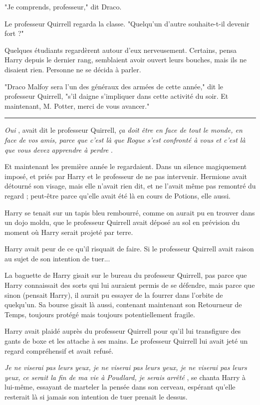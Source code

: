 "Je comprends, professeur," dit Draco.

Le professeur Quirrell regarda la classe. "Quelqu'un d'autre souhaite-t-il devenir fort ?"

Quelques étudiants regardèrent autour d'eux nerveusement. Certains, pensa Harry depuis le dernier rang, semblaient avoir ouvert leurs bouches, mais ils ne disaient rien. Personne ne se décida à parler.

"Draco Malfoy sera l'un des généraux des armées de cette année," dit le professeur Quirrell, "s'il daigne s'impliquer dans cette activité du soir. Et maintenant, M. Potter, merci de vous avancer."
\par\noindent\rule{\textwidth}{0.4pt}
\emph{Oui} , avait dit le professeur Quirrell, \emph{ça doit être en face de tout le monde, en face de vos amis, parce que c'est là que Rogue s'est confronté à vous et c'est là que vous devez apprendre à perdre} .

Et maintenant les première année le regardaient. Dans un silence magiquement imposé, et priés par Harry et le professeur de ne pas intervenir. Hermione avait détourné son visage, mais elle n'avait rien dit, et ne l'avait même pas remontré du regard ; peut-être parce qu'elle avait été là en cours de Potions, elle aussi.

Harry se tenait sur un tapis bleu rembourré, comme on aurait pu en trouver dans un dojo moldu, que le professeur Quirrell avait déposé au sol en prévision du moment où Harry serait projeté par terre.

Harry avait peur de ce qu'il risquait de faire. Si le professeur Quirrell avait raison au sujet de son intention de tuer...

La baguette de Harry gisait sur le bureau du professeur Quirrell, pas parce que Harry connaissait des sorts qui lui auraient permis de se défendre, mais parce que sinon (pensait Harry), il aurait pu essayer de la fourrer dans l'orbite de quelqu'un. Sa bourse gisait là aussi, contenant maintenant son Retourneur de Temps, toujours protégé mais toujours potentiellement fragile.

Harry avait plaidé auprès du professeur Quirrell pour qu'il lui transfigure des gants de boxe et les attache à ses mains. Le professeur Quirrell lui avait jeté un regard compréhensif et avait refusé.

\emph{Je ne viserai pas leurs yeux, je ne viserai pas leurs yeux, je ne viserai pas leurs yeux, ce serait la fin de ma vie à Poudlard, je serais arrêté} , se chanta Harry à lui-même, essayant de marteler la pensée dans son cerveau, espérant qu'elle resterait là si jamais son intention de tuer prenait le dessus.

